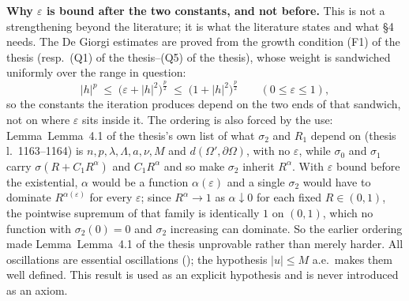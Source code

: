 \begin{definition}
\medskip
\noindent\textbf{Why $\varepsilon$ is bound after the two constants, and not
before.}  This is not a strengthening beyond the literature; it is what the
literature states and what \S4 needs.  The De Giorgi estimates are proved from
the growth condition (F1) of the thesis (resp.\ (Q1) of the thesis--(Q5) of the thesis),
whose weight is sandwiched uniformly over the range in question:
\[
|h|^{p}\;\le\;\bigl(\varepsilon+|h|^{2}\bigr)^{\frac p2}\;\le\;\bigl(1+|h|^{2}\bigr)^{\frac p2}
\qquad(0\le\varepsilon\le1),
\]
so the constants the iteration produces depend on the two ends of that
sandwich, not on where $\varepsilon$ sits inside it.  The ordering is also
forced by the use: Lemma~Lemma~4.1 of the thesis's own list of what $\sigma_2$ and $R_1$
depend on (thesis l.~1163--1164) is $n,p,\lambda,\Lambda,a,\nu,M$ and
$d(\Omega',\partial\Omega)$, with no $\varepsilon$, while $\sigma_0$ and
$\sigma_1$ carry $\sigma(R+C_1R^{\alpha})$ and $C_1R^{\alpha}$ and so make
$\sigma_2$ inherit $R^{\alpha}$.  With $\varepsilon$ bound before the
existential, $\alpha$ would be a function $\alpha(\varepsilon)$ and a single
$\sigma_2$ would have to dominate $R^{\alpha(\varepsilon)}$ for every
$\varepsilon$; since $R^{\alpha}\to1$ as $\alpha\downarrow0$ for each fixed
$R\in(0,1)$, the pointwise supremum of that family is identically $1$ on
$(0,1)$, which no function with $\sigma_2(0)=0$ and $\sigma_2$ increasing can
dominate.  So the earlier ordering made Lemma~Lemma~4.1 of the thesis unprovable rather
than merely harder.  All
oscillations are essential oscillations (); the hypothesis
$|u|\le M$ a.e.\ makes them well defined.  This result is used as an explicit
hypothesis and is never introduced as an axiom.
\end{definition}
